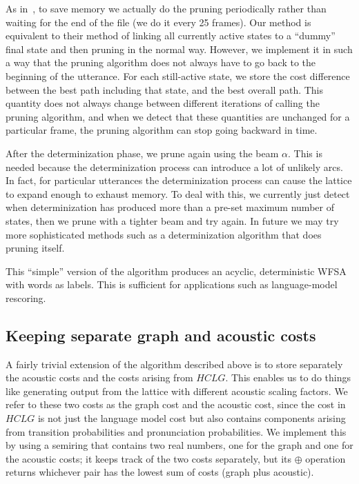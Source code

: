 \documentclass{article}
\def\HCLG{{\mathit{HCLG}}}
\begin{document}
As in~\cite{efficient_general}, to save memory we actually do the pruning
periodically rather than waiting for the end of the file (we do it every 25 frames).
Our method is equivalent to their method of linking all currently active states to a ``dummy''
final state and then pruning in the normal way.  However, we implement it in such a way
that the pruning algorithm does not always have to go back to the beginning of the utterance.
For each still-active state, we store the cost difference between the best path including that
state, and the best overall path.  This quantity does not always change between different
iterations of calling the pruning algorithm, and when we detect that these quantities are 
unchanged for a particular frame, the pruning algorithm can stop going backward in time.

After the determinization phase, we prune again using the beam $\alpha$.  This is needed because
the determinization process can introduce a lot of unlikely arcs.  In fact, for particular
utterances the determinization process can cause the lattice to expand enough to
exhaust memory.  To deal with this, we currently just detect when determinization
has produced more than a pre-set maximum number of states, then we prune with a tighter
beam and try again.  In future we may try more sophisticated methods such as a
determinization algorithm that does pruning itself.

This ``simple'' version of the algorithm produces an acyclic, deterministic
WFSA with words as labels.  This is sufficient for applications such as language-model
rescoring.


\subsection{Keeping separate graph and acoustic costs}

A fairly trivial extension of the algorithm described above is to store separately
the acoustic costs and the costs arising from $\HCLG$.  This enables us to do things
like generating output from the lattice with different acoustic scaling factors.
We refer to these two costs as the graph cost and the acoustic cost, since the cost
in $\HCLG$ is not just the language model cost but also contains components
arising from transition probabilities and pronunciation probabilities.  We implement
this by using a semiring that contains two real numbers, one for the graph and one
for the acoustic costs; it keeps track of the two costs separately, but its
$\oplus$ operation returns whichever pair has the lowest sum of costs (graph plus acoustic).
\end{document}
